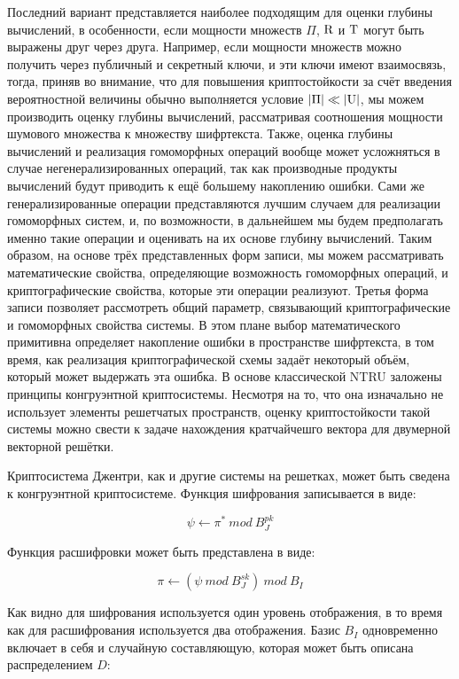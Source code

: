    Последний вариант представляется наиболее подходящим для оценки глубины вычислений, в особенности, если мощности множеств $\Pi $, ${\textrm R}$ и ${\textrm T}$ могут быть выражены друг через друга. Например, если мощности множеств можно получить через публичный и секретный ключи, и эти ключи имеют взаимосвязь, тогда, приняв во внимание, что для повышения криптостойкости за счёт введения вероятностной величины обычно выполняется условие $\left|\Pi \right|\ll |{\textrm U}|$, мы можем производить оценку глубины вычислений, рассматривая соотношения мощности шумового множества к множеству шифртекста.
    Также, оценка глубины вычислений и реализация гомоморфных операций вообще может усложняться в случае негенерализированных операций, так как производные продукты вычислений будут приводить к ещё большему накоплению ошибки. Сами же генерализированные операции представляются лучшим случаем для реализации гомоморфных систем, и, по возможности, в дальнейшем мы будем предполагать именно такие операции и оценивать на их основе глубину вычислений.
    Таким образом, на основе трёх представленных форм записи, мы можем рассматривать математические свойства, определяющие возможность гомоморфных операций, и криптографические свойства, которые эти операции реализуют. Третья форма записи позволяет рассмотреть общий параметр, связывающий криптографические и гомоморфных свойства системы. В этом плане выбор математического примитивна определяет накопление ошибки в пространстве шифртекста, в том время, как реализация криптографической схемы задаёт некоторый объём, который может выдержать эта ошибка.
    В основе классической NTRU заложены принципы конгруэнтной криптосистемы. Несмотря на то, что она изначально не использует элементы решетчатых пространств, оценку криптостойкости такой системы можно свести к задаче нахождения кратчайчешго вектора для двумерной векторной решётки.

    \color{Blue}
    Криптосистема Джентри, как и другие системы на решетках, может быть сведена к конгруэнтной криптосистеме.
    Функция шифрования записывается в виде:
    
    \[\psi \leftarrow {\pi }^*~mod\ B^{pk}_J\] 
    
    Функция расшифровки может быть представлена в виде:
    
    \[\pi \leftarrow \left(\psi ~mod\ B^{sk}_J\right)~mod\ B_I\] 
    
    Как видно для шифрования используется один уровень отображения, в то время как для расшифрования используется два отображения. Базис $B_I$ одновременно включает в себя и случайную составляющую, которая может быть описана распределением $D$:
    
